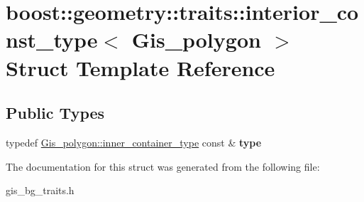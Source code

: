 \hypertarget{structboost_1_1geometry_1_1traits_1_1interior__const__type_3_01Gis__polygon_01_4}{}\section{boost\+:\+:geometry\+:\+:traits\+:\+:interior\+\_\+const\+\_\+type$<$ Gis\+\_\+polygon $>$ Struct Template Reference}
\label{structboost_1_1geometry_1_1traits_1_1interior__const__type_3_01Gis__polygon_01_4}
\subsection*{Public Types}
\begin{DoxyCompactItemize}
\item 
\mbox{\label{structboost_1_1geometry_1_1traits_1_1interior__const__type_3_01Gis__polygon_01_4_a70cd1128996e0ec7c1268f358ab49c05}} 
typedef \mbox{\hyperlink{classGis__wkb__vector}{Gis\+\_\+polygon\+::inner\+\_\+container\+\_\+type}} const  \& {\bfseries type}
\end{DoxyCompactItemize}


The documentation for this struct was generated from the following file\+:\begin{DoxyCompactItemize}
\item 
gis\+\_\+bg\+\_\+traits.\+h\end{DoxyCompactItemize}
